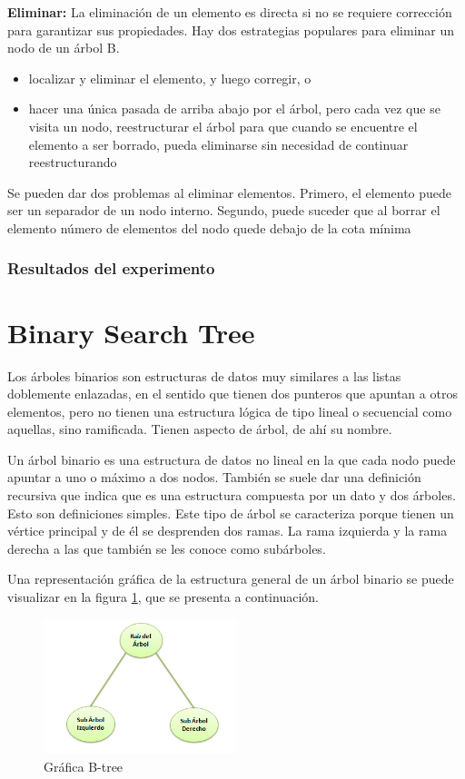 \documentclass{article}
\begin{document}
                \textbf{Eliminar:}
                La eliminación de un elemento es directa si no se requiere corrección para garantizar sus propiedades. Hay dos estrategias populares para eliminar un nodo de un árbol B.
                \begin{itemize}
                  \item localizar y eliminar el elemento, y luego corregir, o
                  \item hacer una única pasada de arriba abajo por el árbol, pero cada vez que se visita un nodo, reestructurar el árbol para que cuando se encuentre el elemento a ser borrado, pueda eliminarse sin necesidad de continuar reestructurando
                \end{itemize}
                Se pueden dar dos problemas al eliminar elementos. Primero, el elemento puede ser un separador de un nodo interno. Segundo, puede suceder que al borrar el elemento número de elementos del nodo quede debajo de la cota mínima

            \subsubsection{Resultados del experimento}



    \section{Binary Search Tree}

        Los árboles binarios son estructuras de datos muy similares a las listas doblemente enlazadas, en el sentido que tienen dos punteros que apuntan a otros elementos, pero no tienen una estructura lógica de tipo lineal o secuencial como aquellas, sino ramificada.  Tienen aspecto de árbol, de ahí su nombre.

        Un árbol binario es una estructura de datos no lineal en la que cada nodo puede apuntar a uno o máximo a dos nodos. También se suele dar una definición recursiva que indica que es una estructura compuesta por un dato y dos árboles. Esto son definiciones simples. Este tipo de árbol se caracteriza porque tienen un vértice principal y de él se desprenden dos ramas. La rama izquierda y la rama derecha a las que también se les conoce como subárboles.

        Una representación gráfica de la estructura general de un árbol binario se puede visualizar en la figura \ref{fig:b-tree}, que se presenta a continuación.
        \begin{figure}[htbp]
              \centering
              \includegraphics[width=0.5\textwidth]{img/estructura_arbol_binario.png}
              \caption{Gráfica B-tree}
              \label{fig:b-tree}
            \end{figure} 
\end{document}
